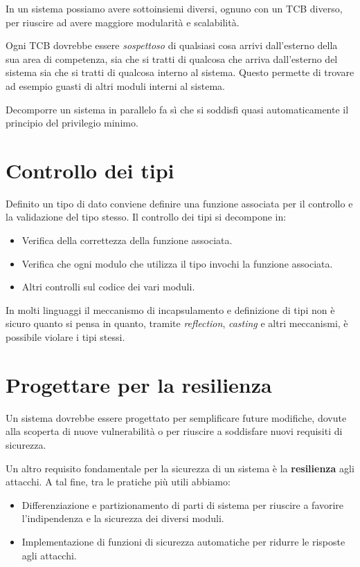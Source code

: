 In un sistema possiamo avere sottoinsiemi diversi, ognuno con un TCB diverso, per riuscire ad avere maggiore
modularità e scalabilità.

Ogni TCB dovrebbe essere \emph{sospettoso} di qualsiasi cosa arrivi dall'esterno della sua area di competenza, sia
che si tratti di qualcosa che arriva dall'esterno del sistema sia che si tratti di qualcosa interno al sistema.
Questo permette di trovare ad esempio guasti di altri moduli interni al sistema.

Decomporre un sistema in parallelo fa sì che si soddisfi quasi automaticamente il principio del privilegio minimo.

\section{Controllo dei tipi}
Definito un tipo di dato conviene definire una funzione associata per il controllo e la validazione del tipo stesso.
Il controllo dei tipi si decompone in:
\begin{itemize}
	\item Verifica della correttezza della funzione associata.
	\item Verifica che ogni modulo che utilizza il tipo invochi la funzione associata.
	\item Altri controlli sul codice dei vari moduli.
\end{itemize}
In molti linguaggi il meccanismo di incapsulamento e definizione di tipi non è sicuro quanto si pensa in quanto,
tramite \emph{reflection}, \emph{casting} e altri meccanismi, è possibile violare i tipi stessi.

\section{Progettare per la resilienza}
Un sistema dovrebbe essere progettato per semplificare future modifiche, dovute alla scoperta di nuove vulnerabilità
o per riuscire a soddisfare nuovi requisiti di sicurezza.

Un altro requisito fondamentale per la sicurezza di un sistema è la \textbf{resilienza} agli attacchi. A tal fine,
tra le pratiche più utili abbiamo:
\begin{itemize}
	\item Differenziazione e partizionamento di parti di sistema per riuscire a favorire l'indipendenza e la
	      sicurezza dei diversi moduli.
	\item Implementazione di funzioni di sicurezza automatiche per ridurre le risposte agli attacchi.
\end{itemize}

